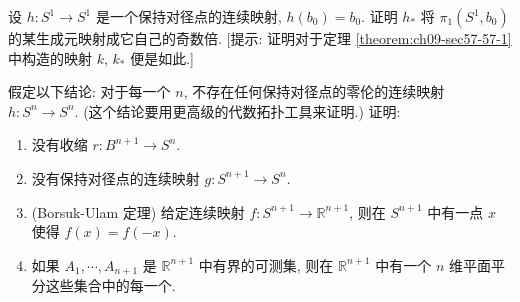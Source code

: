 \begin{exercise}
设 $h\colon S^{1}\to S^{1}$ 是一个保持对径点的连续映射, $h(b_0)=b_0$. 证明 $h_*$ 将 $\pi_1(S^{1},b_0)$ 的某生成元映射成它自己的奇数倍. [提示: 证明对于定理 \cref{theorem:ch09-sec57-57-1} 中构造的映射 $k$, $k_*$ 便是如此.]
\end{exercise}

\begin{exercise}
假定以下结论: 对于每一个 $n$, 不存在任何保持对径点的零伦的连续映射 $h\colon S^{n}\to S^{n}$. (这个结论要用更高级的代数拓扑工具来证明.) 证明:
\begin{enumerate}
\item 没有收缩 $r\colon B^{n+1}\to S^{n}$.
\item 没有保持对径点的连续映射 $g\colon S^{n+1}\to S^{n}$.
\item (Borsuk-Ulam 定理) 给定连续映射 $f\colon S^{n+1}\to\mathbb{R}^{n+1}$, 则在 $S^{n+1}$ 中有一点 $x$ 使得 $f(x)=f(-x)$.
\item 如果 $A_1,\cdots,A_{n+1}$ 是 $\mathbb{R}^{n+1}$ 中有界的可测集, 则在 $\mathbb{R}^{n+1}$ 中有一个 $n$ 维平面平分这些集合中的每一个.
\end{enumerate}
\end{exercise}
